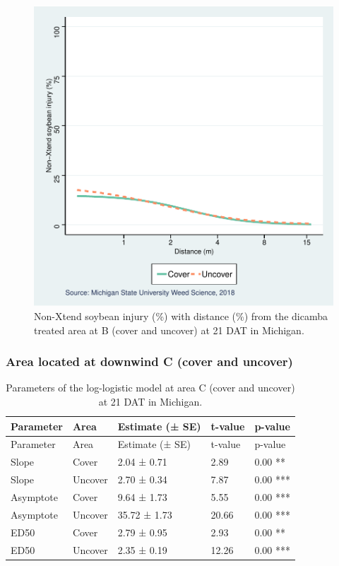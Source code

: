 \documentclass[]{article}
\begin{document}
\begin{figure}
\centering
\includegraphics{Report_Dicamba_study_files/figure-latex/unnamed-chunk-50-1.pdf}
\caption{Non-Xtend soybean injury (\%) with distance (\%) from the
dicamba treated area at B (cover and uncover) at 21 DAT in Michigan.}
\end{figure}

\pagebreak

\subsubsection{Area located at downwind C (cover and
uncover)}\label{area-located-at-downwind-c-cover-and-uncover}

\begin{longtable}[]{@{}lllll@{}}
\caption{Parameters of the log-logistic model at area C (cover and
uncover) at 21 DAT in Michigan.}\tabularnewline
\toprule
Parameter & Area & Estimate (± SE) & t-value & p-value\tabularnewline
\midrule
\endfirsthead
\toprule
Parameter & Area & Estimate (± SE) & t-value & p-value\tabularnewline
\midrule
\endhead
Slope & Cover & 2.04 ± 0.71 & 2.89 & 0.00 **\tabularnewline
Slope & Uncover & 2.70 ± 0.34 & 7.87 & 0.00 ***\tabularnewline
Asymptote & Cover & 9.64 ± 1.73 & 5.55 & 0.00 ***\tabularnewline
Asymptote & Uncover & 35.72 ± 1.73 & 20.66 & 0.00 ***\tabularnewline
ED50 & Cover & 2.79 ± 0.95 & 2.93 & 0.00 **\tabularnewline
ED50 & Uncover & 2.35 ± 0.19 & 12.26 & 0.00 ***\tabularnewline
\bottomrule
\end{longtable}
\end{document}
